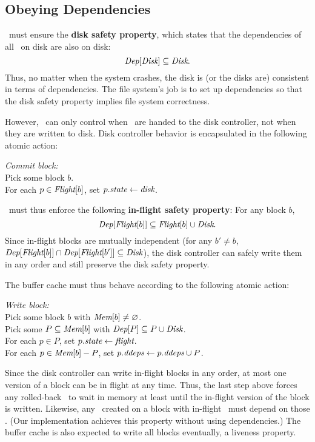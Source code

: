 \subsection{Obeying Dependencies}
\label{sec:patch:dependencies}

\Kudos\ must ensure the \textbf{disk safety property}, which states that
 the dependencies of all \patches\ on disk are also on disk:
%
\[ \PDepset{\PDisk} \subseteq \PDisk. \]
%
Thus, no matter when the system crashes, the disk is (or the disks are)
consistent in terms of dependencies.
%
The file system's job is to set up dependencies so that the disk safety
property implies file system correctness.

However, \Kudos\ can only control when \patches\ are handed to the disk
 controller, not when they are written to disk.
%
Disk controller behavior is encapsulated in the following atomic action:

\begin{tabbing}
\textit{Commit block:} \\
\quad Pick some block $b$. \\
\quad For each $p \in \PInf[b]$, set $p.\textit{state} \gets \textit{disk}$.
\end{tabbing}

\noindent
%
\Kudos\ must thus enforce the following \textbf{in-flight
 safety property}: For any block $b$,
%
\[ \PDepset{\PInf[b]} \subseteq \PInf[b] \cup \PDisk . \]
%
Since in-flight blocks are mutually independent (for any $b' \neq b$,
 $\PDepset{\PInf[b]} \cap \PDepset{\PInf[b']} \subseteq \PDisk$), the disk
 controller can safely write them in any order and still preserve the disk
 safety property.


The buffer cache must thus behave according to the following atomic action:

\begin{tabbing}
\textit{Write block:} \\
\quad Pick some block $b$ with $\PMem[b] \neq \emptyset$. \\
\quad Pick some $P \subseteq \PMem[b]$ with $\PDepset{P} \subseteq P \cup
\PDisk$. \\
\quad For each $p \in P$, set $p.\textit{state} \gets \textit{flight}$. \\
\quad For each $p \in \PMem[b]-P$, set $\PDDepset{p} \gets \PDDepset{p}
\cup P$.
\end{tabbing}

\noindent
%
Since the disk controller can write in-flight blocks in any order, at most
one version of a block can be in flight at any time.
%
Thus, the last step above forces any rolled-back \patches\ to wait in
memory at least until the in-flight version of the block is written.
%
Likewise, any \patch\ created on a block with in-flight \patches\ must depend
on those \patches.
%
(Our implementation achieves this property without using dependencies.)
%
The buffer cache is also expected to write all blocks eventually, a
 liveness property.


